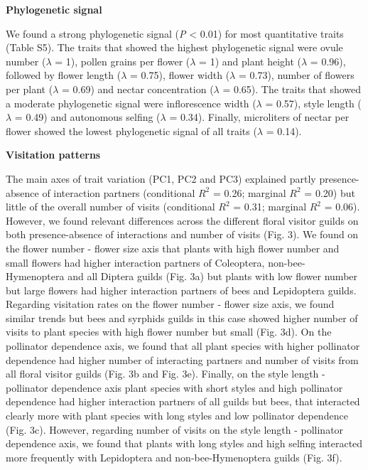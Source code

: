 \documentclass[
  12pt,
  a4paper,
]{article}
\begin{document}
\textbf{Phylogenetic signal}

We found a strong phylogenetic signal (\emph{P} \textless{} 0.01) for most quantitative traits (Table S5). The traits that showed the highest phylogenetic signal were ovule number (\(\lambda\) = 1), pollen grains per flower (\(\lambda\) = 1) and plant height (\(\lambda\) = 0.96), followed by flower length (\(\lambda\) = 0.75), flower width (\(\lambda\) = 0.73), number of flowers per plant (\(\lambda\) = 0.69) and nectar concentration (\(\lambda\) = 0.65). The traits that showed a moderate phylogenetic signal were inflorescence width (\(\lambda\) = 0.57), style length (\(\lambda\) = 0.49) and autonomous selfing (\(\lambda\) = 0.34). Finally, microliters of nectar per flower showed the lowest phylogenetic signal of all traits (\(\lambda\) = 0.14).

\textbf{Visitation patterns}

The main axes of trait variation (PC1, PC2 and PC3) explained partly presence-absence of interaction partners (conditional \(R^{2}\) = 0.26; marginal \(R^{2}\) = 0.20) but little of the overall number of visits (conditional \(R^{2}\) = 0.31; marginal \(R^{2}\) = 0.06). However, we found relevant differences across the different floral visitor guilds on both presence-absence of interactions and number of visits (Fig. 3). We found on the flower number - flower size axis that plants with high flower number and small flowers had higher interaction partners of Coleoptera, non-bee-Hymenoptera and all Diptera guilds (Fig. 3a) but plants with low flower number but large flowers had higher interaction partners of bees and Lepidoptera guilds. Regarding visitation rates on the flower number - flower size axis, we found similar trends but bees and syrphids guilds in this case showed higher number of visits to plant species with high flower number but small (Fig. 3d). On the pollinator dependence axis, we found that all plant species with higher pollinator dependence had higher number of interacting partners and number of visits from all floral visitor guilds (Fig. 3b and Fig. 3e). Finally, on the style length - pollinator dependence axis plant species with short styles and high pollinator dependence had higher interaction partners of all guilds but bees, that interacted clearly more with plant species with long styles and low pollinator dependence (Fig. 3c). However, regarding number of visits on the style length - pollinator dependence axis, we found that plants with long styles and high selfing interacted more frequently with Lepidoptera and non-bee-Hymenoptera guilds (Fig. 3f).
\end{document}
